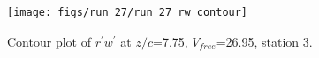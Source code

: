 \begin{figure}[H]
\centering
\texttt{[image: figs/run\_27/run\_27\_rw\_contour]}
\caption{Contour plot of $\overline{r^\prime w^\prime}$ at $z/c$=7.75, $V_{free}$=26.95, station 3.}
\label{fig:run_27_rw_contour}
\end{figure}


